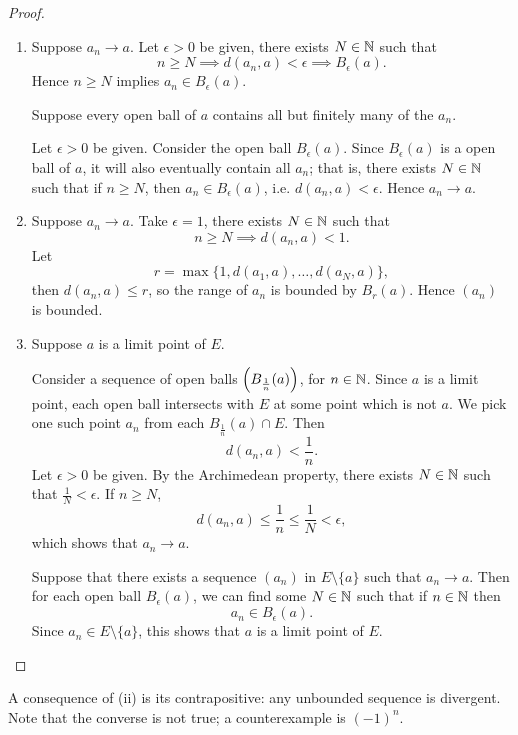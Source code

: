 \begin{proof} \
\begin{enumerate}[label=(\roman*)]
\item \fbox{$\implies$} Suppose $a_n\to a$. Let $\epsilon>0$ be given, there exists $N\in\mathbb N$ such that
\[n\ge N\implies d(a_n,a)<\epsilon\implies B_\epsilon(a).\]
Hence $n\ge N$ implies $a_n\in B_\epsilon(a)$.

\fbox{$\impliedby$} Suppose every open ball of $a$ contains all but finitely many of the $a_n$.

Let $\epsilon>0$ be given. Consider the open ball $B_\epsilon(a)$. Since $B_\epsilon(a)$ is a open ball of $a$, it will also eventually contain all $a_n$; that is, there exists $N\in\mathbb N$ such that if $n\ge N$, then $a_n\in B_\epsilon(a)$, i.e. $d(a_n,a)<\epsilon$. Hence $a_n\to a$.

\item Suppose $a_n\to a$. Take $\epsilon=1$, there exists $N\in\mathbb N$ such that
\[n\ge N\implies d(a_n,a)<1.\]
Let
\[r=\max\{1,d(a_1,a),\dots,d(a_N,a)\},\]
then $d(a_n,a)\le r$, so the range of $a_n$ is bounded by $B_r(a)$. Hence $(a_n)$ is bounded.

\item \fbox{$\implies$} Suppose $a$ is a limit point of $E$. 

Consider a sequence of open balls $\left(B_\frac{1}{n}(a)\right)$, for $n\in\mathbb N$. Since $a$ is a limit point, each open ball intersects with $E$ at some point which is not $a$. We pick one such point $a_n$ from each $B_\frac{1}{n}(a)\cap E$. Then
\[d(a_n,a)<\frac{1}{n}.\]
Let $\epsilon>0$ be given. By the Archimedean property, there exists $N\in\mathbb N$ such that $\frac{1}{N}<\epsilon$. If $n\ge N$,
\[d(a_n,a)\le\frac{1}{n}\le\frac{1}{N}<\epsilon,\]
which shows that $a_n\to a$.

\fbox{$\impliedby$} Suppose that there exists a sequence $(a_n)$ in $E\setminus\{a\}$ such that $a_n\to a$. Then for each open ball $B_\epsilon(a)$, we can find some $N\in\mathbb N$ such that if $n\in\mathbb N$ then
\[a_n\in B_\epsilon(a).\]
Since $a_n\in E\setminus\{a\}$, this shows that $a$ is a limit point of $E$.
\end{enumerate}
\end{proof}

\begin{remark}
A consequence of (ii) is its contrapositive: any unbounded sequence is divergent. 
Note that the converse is not true; a counterexample is $(-1)^n$.
\end{remark}

